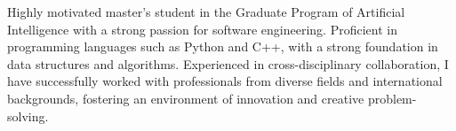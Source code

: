 

\begin{cvparagraph}

Highly motivated master's student in the Graduate Program of Artificial Intelligence with a strong passion for software engineering. Proficient in programming languages such as Python and C++, with a strong foundation in data structures and algorithms. Experienced in cross-disciplinary collaboration, I have successfully worked with professionals from diverse fields and international backgrounds, fostering an environment of innovation and creative problem-solving.
\end{cvparagraph}
